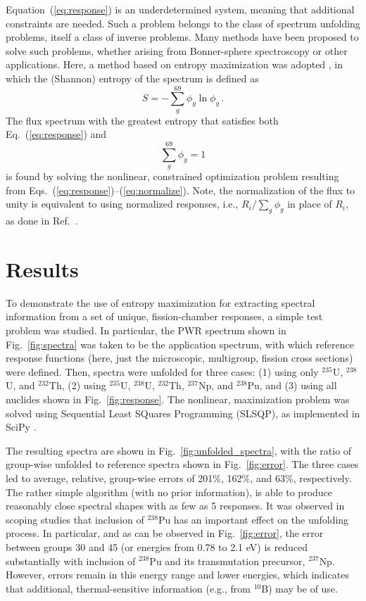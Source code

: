 \documentclass[journal]{IEEEtran}
\newcommand{\EQ}[1]{Eq.~(\ref{#1})}               %
\newcommand{\EQUATION}[1]{Equation~(\ref{#1})}    %
\newcommand{\FIG}[1]{Fig.~\ref{#1}}               %
\begin{document}
\EQUATION{eq:response} is an underdetermined system, meaning that additional constraints are needed.  Such a problem belongs to the class of  spectrum unfolding problems, itself a class of inverse problems.  Many methods have been proposed to solve such problems, whether arising from Bonner-sphere spectroscopy or other applications.  Here, a method based on  entropy maximization was adopted \cite{itoh1989neutron}, in which the (Shannon) entropy of the spectrum is defined as
\begin{equation}
 S = -\sum^{69}_g \phi_g \ln \phi_g \, .
\label{eq:entropy}
\end{equation}
The flux spectrum with the greatest entropy that satisfies both \EQ{eq:response} and
\begin{equation}
 \sum^{69}_g \phi_g = 1
\label{eq:normalize}
\end{equation}
is found by solving the nonlinear, constrained optimization problem resulting from Eqs.~(\ref{eq:response})--(\ref{eq:normalize}).  Note, the normalization of the flux to unity is equivalent to using normalized responses, i.e., $R_i/\sum_g \phi_g$ in place of $R_i$, as done in Ref.~\cite{itoh1989neutron}.

\section{Results}

To demonstrate the use of entropy maximization for extracting spectral information from a set of unique, fission-chamber responses,  a simple test problem was studied.  In particular, the PWR spectrum shown in \FIG{fig:spectra} was taken to be the application spectrum, with which reference response functions (here, just the microscopic, multigroup, fission cross sections) were defined.  Then, spectra were unfolded for three cases: (1) using only ${}^{235}$U, ${}^{238}$U, and ${}^{232}$Th, (2) using  ${}^{235}$U, ${}^{238}$U, ${}^{232}$Th, ${}^{237}$Np, and ${}^{238}$Pu, and (3) using all nuclides shown in \FIG{fig:response}.  
The nonlinear, maximization problem was solved using Sequential Least SQuares Programming (SLSQP), as implemented in SciPy \cite{scipy}.

The resulting spectra are shown in \FIG{fig:unfolded_spectra}, with the ratio of group-wise unfolded to reference spectra shown in \FIG{fig:error}. The three cases led to average, relative, group-wise errors of 201\%, 162\%, and 63\%, respectively.   The rather simple algorithm (with no prior information), is able to produce reasonably close spectral shapes with as few as 5 responses.  It was observed in scoping studies that inclusion of ${}^{238}$Pu has an important effect on the unfolding process.  In particular, and as can be observed in \FIG{fig:error}, the error between groups 30 and 45 (or energies from 0.78 to 2.1 eV) is reduced substantially with inclusion of ${}^{238}$Pu and its transmutation precursor, ${}^{237}$Np.  However, errors remain in this energy range and lower energies, which indicates that additional, thermal-sensitive information (e.g., from ${}^{10}$B) may be of use.
\end{document}
